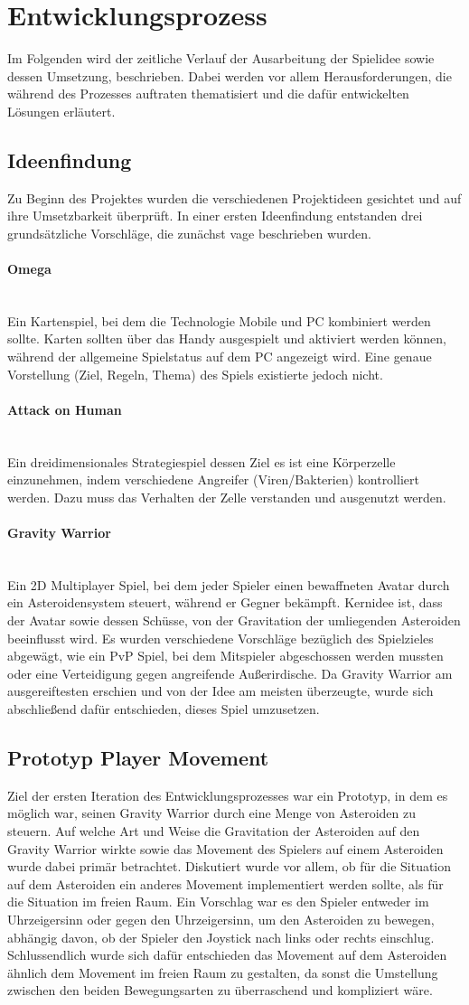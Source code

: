 \documentclass[11pt]{scrartcl}
\newcommand{\lbparagraph}[1]{\paragraph*{#1}\mbox{}\\}
\begin{document}
\newpage
\section{Entwicklungsprozess}
Im Folgenden wird der zeitliche Verlauf der Ausarbeitung der Spielidee sowie dessen Umsetzung, beschrieben. Dabei werden vor allem Herausforderungen, die während des Prozesses auftraten thematisiert und die dafür entwickelten Lösungen erläutert.
\subsection{Ideenfindung}
Zu Beginn des Projektes wurden die verschiedenen Projektideen gesichtet und auf ihre Umsetzbarkeit überprüft. In einer ersten Ideenfindung entstanden drei grundsätzliche Vorschläge, die zunächst vage beschrieben wurden.

\lbparagraph{Omega}
Ein Kartenspiel, bei dem die Technologie Mobile und PC kombiniert werden sollte. Karten sollten über das Handy ausgespielt und aktiviert werden können, während der allgemeine Spielstatus auf dem PC angezeigt wird. Eine genaue Vorstellung (Ziel, Regeln, Thema) des Spiels existierte jedoch nicht.
\lbparagraph{Attack on Human}
Ein dreidimensionales Strategiespiel dessen Ziel es ist eine Körperzelle einzunehmen, indem verschiedene Angreifer (Viren/Bakterien) kontrolliert werden. Dazu muss das Verhalten der Zelle verstanden und ausgenutzt werden.

\lbparagraph{Gravity Warrior}
Ein 2D Multiplayer Spiel, bei dem jeder Spieler einen bewaffneten Avatar durch ein Asteroidensystem steuert, während er Gegner bekämpft. Kernidee ist, dass der Avatar sowie dessen Schüsse, von der Gravitation der umliegenden Asteroiden beeinflusst wird.
Es wurden verschiedene Vorschläge bezüglich des Spielzieles abgewägt, wie ein PvP Spiel, bei dem Mitspieler abgeschossen werden mussten oder eine Verteidigung gegen angreifende Außerirdische. Da Gravity Warrior am ausgereiftesten erschien und von der Idee am meisten überzeugte, wurde sich abschließend dafür entschieden, dieses Spiel umzusetzen.

\subsection{Prototyp Player Movement}
Ziel der ersten Iteration des Entwicklungsprozesses war ein Prototyp, in dem es möglich war, seinen Gravity Warrior durch eine Menge von Asteroiden zu steuern. Auf welche Art und Weise die Gravitation der Asteroiden auf den Gravity Warrior wirkte sowie das Movement des Spielers auf einem Asteroiden wurde dabei primär betrachtet. Diskutiert wurde vor allem, ob für die Situation auf dem Asteroiden ein anderes Movement implementiert werden sollte, als für die Situation im freien Raum. Ein Vorschlag war es den Spieler entweder im Uhrzeigersinn oder gegen den Uhrzeigersinn, um den Asteroiden zu bewegen, abhängig davon, ob der Spieler den Joystick nach links oder rechts einschlug. Schlussendlich wurde sich dafür entschieden das Movement auf dem Asteroiden ähnlich dem Movement im freien Raum zu gestalten, da sonst die Umstellung zwischen den beiden Bewegungsarten zu überraschend und kompliziert wäre.
\end{document}
